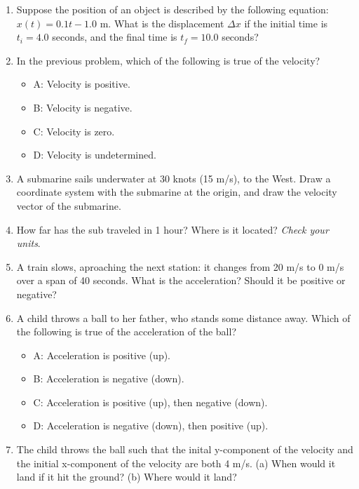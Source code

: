 \documentclass[10pt]{article}
\begin{document}
\begin{enumerate}
\item Suppose the position of an object is described by the following equation: $x(t) = 0.1 t - 1.0$ m.  What is the displacement $\Delta x$ if the initial time is $t_i = 4.0$ seconds, and the final time is $t_f = 10.0$ seconds? \\ \vspace{1cm}
\item In the previous problem, which of the following is true of the velocity?
\begin{itemize}
\item A: Velocity is positive.
\item B: Velocity is negative.
\item C: Velocity is zero.
\item D: Velocity is undetermined.
\end{itemize}
\item A submarine sails underwater at 30 knots (15 m/s), to the West.  Draw a coordinate system with the submarine at the origin, and draw the velocity vector of the submarine. \\ \vspace{2cm}
\item How far has the sub traveled in 1 hour?  Where is it located? \textit{Check your units}. \\ \vspace{2cm}
\item A train slows, aproaching the next station: it changes from 20 m/s to 0 m/s over a span of 40 seconds.  What is the acceleration? Should it be positive or negative? \\ \vspace{1cm}
\item A child throws a ball to her father, who stands some distance away.  Which of the following is true of the acceleration of the ball?
\begin{itemize}
\item A: Acceleration is positive (up).
\item B: Acceleration is negative (down).
\item C: Acceleration is positive (up), then negative (down).
\item D: Acceleration is negative (down), then positive (up).
\end{itemize}
\item The child throws the ball such that the inital y-component of the velocity and the initial x-component of the velocity are both 4 m/s.  (a) When would it land if it hit the ground?  (b) Where would it land? \\ \vspace{3cm}
\end{enumerate}
\end{document}
